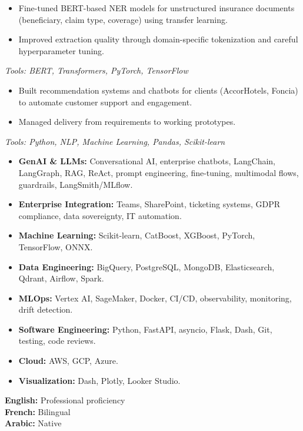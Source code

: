 \documentclass[10pt,a4paper]{altacv}
\begin{document}
\begin{itemize}
  \item Fine-tuned BERT-based NER models for unstructured insurance documents (beneficiary, claim type, coverage) using transfer learning.
  \item Improved extraction quality through domain-specific tokenization and careful hyperparameter tuning.
\end{itemize}
\textit{Tools: BERT, Transformers, PyTorch, TensorFlow}

\divider

\begin{itemize}
  \item Built recommendation systems and chatbots for clients (AccorHotels, Foncia) to automate customer support and engagement.
  \item Managed delivery from requirements to working prototypes.
\end{itemize}
\textit{Tools: Python, NLP, Machine Learning, Pandas, Scikit-learn}

\divider
{}

\begin{itemize}
  \item \textbf{GenAI \& LLMs:} Conversational AI, enterprise chatbots, LangChain, LangGraph, RAG, ReAct, prompt engineering, fine-tuning, multimodal flows, guardrails, LangSmith/MLflow.
  \item \textbf{Enterprise Integration:} Teams, SharePoint, ticketing systems, GDPR compliance, data sovereignty, IT automation.
  \item \textbf{Machine Learning:} Scikit-learn, CatBoost, XGBoost, PyTorch, TensorFlow, ONNX.
  \item \textbf{Data Engineering:} BigQuery, PostgreSQL, MongoDB, Elasticsearch, Qdrant, Airflow, Spark.
  \item \textbf{MLOps:} Vertex AI, SageMaker, Docker, CI/CD, observability, monitoring, drift detection.
  \item \textbf{Software Engineering:} Python, FastAPI, asyncio, Flask, Dash, Git, testing, code reviews.
  \item \textbf{Cloud:} AWS, GCP, Azure.
  \item \textbf{Visualization:} Dash, Plotly, Looker Studio.
\end{itemize}

\textbf{English:} Professional proficiency \\
\textbf{French:} Bilingual \\
\textbf{Arabic:} Native
\end{document}
